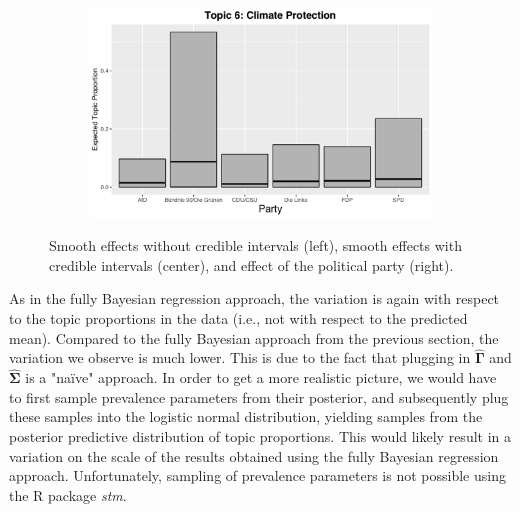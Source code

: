 \begin{figure}[h!]
\begin{subfigure}[b]{0.3\linewidth}
  \end{subfigure}
  \begin{subfigure}[b]{0.3\linewidth}
    \includegraphics[width=\linewidth]{../plots/5_1/direct_t6_cat.pdf}
  \end{subfigure}
  \caption{Smooth effects without credible intervals (left), smooth effects with credible intervals (center), and effect of the political party (right).}
  \label{fig:directassessment}
\end{figure}

As in the fully Bayesian regression approach, the variation is again with respect to the topic proportions in the data (i.e., not with respect to the predicted mean). Compared to the fully Bayesian approach from the previous section, the variation we observe is much lower. This is due to the fact that plugging in $\hat{\boldsymbol{\Gamma}}$ and $\hat{\boldsymbol{\Sigma}}$ is a "na{\"i}ve" approach. In order to get a more realistic picture, we would have to first sample prevalence parameters from their posterior, and subsequently plug these samples into the logistic normal distribution, yielding samples from the posterior predictive distribution of topic proportions. This would likely result in a variation on the scale of the results obtained using the fully Bayesian regression approach. Unfortunately, sampling of prevalence parameters is not possible using the R package \textit{stm}. 


